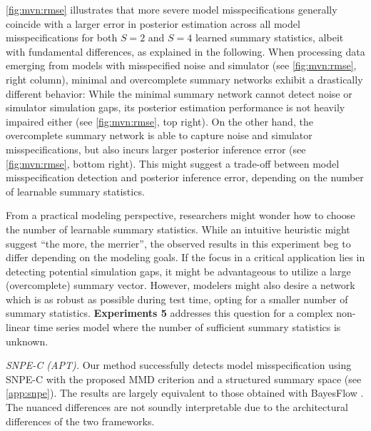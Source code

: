 \documentclass[twoside,11pt]{article}
\newcommand{\numberCovid}{5}
\newcommand{\x}{\boldsymbol{x}}
\newcommand{\thetab}{\boldsymbol{\theta}}
\newcommand{\0}{\boldsymbol{0}}
\newcommand{\given}{\,|\,}
\newcommand{\M}{\mathcal{M}}
\renewcommand{\cite}[1]{\citep{#1}}
\begin{document}

\autoref{fig:mvn:rmse} illustrates that more severe model misspecifications generally coincide with a larger error in posterior estimation across all model misspecifications for both $S=2$ and $S=4$ learned summary statistics, albeit with fundamental differences, as explained in the following.
When processing data emerging from models with misspecified noise and simulator (see \autoref{fig:mvn:rmse}, right column), minimal and overcomplete summary networks exhibit a drastically different behavior:
While the minimal summary network cannot detect noise or simulator simulation gaps, its posterior estimation performance is not heavily impaired either (see \autoref{fig:mvn:rmse}, top right).
On the other hand, the overcomplete summary network is able to capture noise and simulator misspecifications, but also incurs larger posterior inference error (see \autoref{fig:mvn:rmse}, bottom right).
This might suggest a trade-off between model misspecification detection and posterior inference error, depending on the number of learnable summary statistics.

From a practical modeling perspective, researchers might wonder how to choose the number of learnable summary statistics.
While an intuitive heuristic might suggest ``the more, the merrier'', the observed results in this experiment beg to differ depending on the modeling goals.
If the focus in a critical application lies in detecting potential simulation gaps, it might be advantageous to utilize a large (overcomplete) summary vector.
However, modelers might also desire a network which is as robust as possible during test time, opting for a smaller number of summary statistics.
\textbf{Experiments \numberCovid} addresses this question for a complex non-linear time series model where the number of sufficient summary statistics is unknown.

\textit{SNPE-C (APT).}
Our method successfully detects model misspecification using SNPE-C \cite{apt} with the proposed MMD criterion and a structured summary space (see \autoref{app:snpe}).
The results are largely equivalent to those obtained with BayesFlow \cite{bayesflow}.
The nuanced differences are not soundly interpretable due to the architectural differences of the two frameworks.
\end{document}
